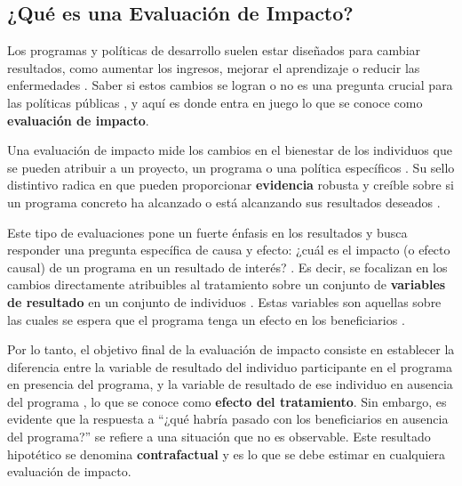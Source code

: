 \documentclass[../../main.tex]{subfiles}
\begin{document}
\subsection{¿Qué es una Evaluación de Impacto?}

Los programas y políticas de desarrollo suelen estar diseñados para cambiar resultados, como aumentar los ingresos, mejorar el aprendizaje o reducir las enfermedades \cite{gertler-2016}. Saber si estos cambios se logran o no es una pregunta crucial para las políticas públicas \cite{gertler-2016}, y aquí es donde entra en juego lo que se conoce como \textbf{evaluación de impacto}.

Una evaluación de impacto mide los cambios en el bienestar de los individuos que se pueden atribuir a un proyecto, un programa o una política específicos \cite{gertler-2016}. Su sello distintivo radica en que pueden proporcionar \textbf{evidencia} robusta y creíble sobre si un programa concreto ha alcanzado o está alcanzando sus resultados deseados \cite{gertler-2016}. 

Este tipo de evaluaciones pone un fuerte énfasis en los resultados y busca responder una pregunta específica de causa y efecto: ¿cuál es el impacto (o efecto causal) de un programa en un resultado de interés? \cite{gertler-2016}. Es decir, se focalizan en los cambios directamente atribuibles al tratamiento \cite{gertler-2016} sobre un conjunto de \textbf{variables de resultado} en un conjunto de individuos \cite{bernal}. Estas variables son aquellas sobre las cuales se espera que el programa tenga un efecto en los beneficiarios \cite{bernal}.

Por lo tanto, el objetivo final de la evaluación de impacto consiste en establecer la diferencia entre la variable de resultado del individuo participante en el programa en presencia del programa, y la variable de resultado de ese individuo en ausencia del programa \cite{bernal}, lo que se conoce como \textbf{efecto del tratamiento}. Sin embargo, es evidente que la respuesta a ``¿qué habría pasado con los beneficiarios en ausencia del programa?'' se refiere a una situación que no es observable. Este resultado hipotético se denomina \textbf{contrafactual} y es lo que se debe estimar en cualquiera evaluación de impacto.
\end{document}
